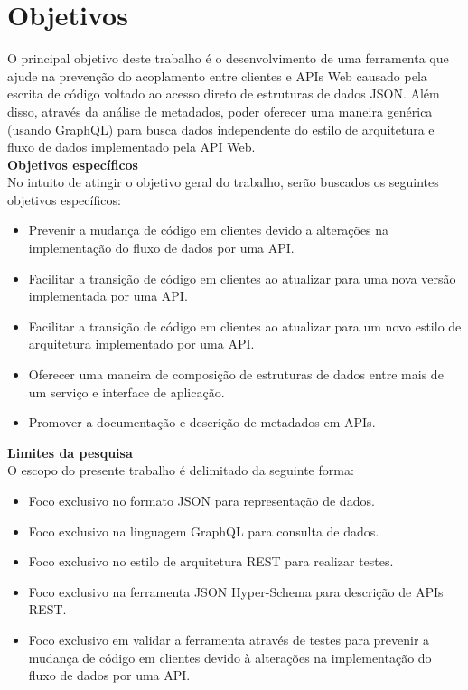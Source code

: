 \section[Objetivos]{Objetivos}

O principal objetivo deste trabalho é o desenvolvimento de uma ferramenta que ajude na prevenção do acoplamento entre clientes e APIs Web causado pela escrita de código voltado ao acesso direto de estruturas de dados JSON. Além disso, através da análise de metadados, poder oferecer uma maneira genérica (usando GraphQL) para busca dados independente do estilo de arquitetura e fluxo de dados implementado pela API Web. \\

\textbf{Objetivos específicos} \\

No intuito de atingir o objetivo geral do trabalho, serão buscados os seguintes objetivos específicos:

\begin{itemize}
\item Prevenir a mudança de código em clientes devido a alterações na implementação do fluxo de dados por uma API.
\item Facilitar a transição de código em clientes ao atualizar para uma nova versão implementada por uma API.
\item Facilitar a transição de código em clientes ao atualizar para um novo estilo de arquitetura implementado por uma API.
\item Oferecer uma maneira de composição de estruturas de dados entre mais de um serviço e interface de aplicação.
\item Promover a documentação e descrição de metadados em APIs. \\
\end{itemize}

\textbf{Limites da pesquisa} \\

O escopo do presente trabalho é delimitado da seguinte forma:

\begin{itemize}
\item Foco exclusivo no formato JSON para representação de dados.
\item Foco exclusivo na linguagem GraphQL para consulta de dados.
\item Foco exclusivo no estilo de arquitetura REST para realizar testes.
\item Foco exclusivo na ferramenta JSON Hyper-Schema para descrição de APIs REST.
\item Foco exclusivo em validar a ferramenta através de testes para prevenir a mudança de código em clientes devido à alterações na implementação do fluxo de dados por uma API.
\end{itemize}
